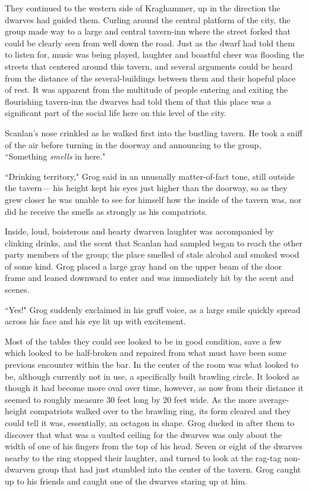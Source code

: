 They continued to the western side of Kraghammer, up in the direction the dwarves had guided them. Curling around the central platform of the city, the group made way to a large and central tavern-inn where the street forked that could be clearly seen from well down the road. Just as the dwarf had told them to listen for, music was being played, laughter and boastful cheer was flooding the streets that centered around this tavern, and several arguments could be heard from the distance of the several-buildings between them and their hopeful place of rest. It was apparent from the multitude of people entering and exiting the flourishing tavern-inn the dwarves had told them of that this place was a significant part of the social life here on this level of the city.

Scanlan's nose crinkled as he walked first into the bustling tavern. He took a sniff of the air before turning in the doorway and announcing to the group, ``Something \textit{smells} in here."

``Drinking territory," Grog said in an unusually matter-of-fact tone, still outside the tavern--- his height kept his eyes just higher than the doorway, so as they grew closer he was unable to see for himself how the inside of the tavern was, nor did he receive the smells as strongly as his compatriots. 

Inside, loud, boisterous and hearty dwarven laughter was accompanied by clinking drinks, and the scent that Scanlan had sampled began to reach the other party members of the group; the place smelled of stale alcohol and smoked wood of some kind. Grog placed a large gray hand on the upper beam of the door frame and leaned downward to enter and was immediately hit by the scent and scenes. 

``Yes!" Grog suddenly exclaimed in his gruff voice, as a large smile quickly spread across his face and his eye lit up with excitement.

Most of the tables they could see looked to be in good condition, save a few which looked to be half-broken and repaired from what must have been some previous encounter within the bar. In the center of the room was what looked to be, although currently not in use, a specifically built brawling circle. It looked as though it had become more oval over time, however, as now from their distance it seemed to roughly measure 30 feet long by 20 feet wide. As the more average-height compatriots walked over to the brawling ring, its form cleared and they could tell it was, essentially, an octagon in shape. Grog ducked in after them to discover that what was a vaulted ceiling for the dwarves was only about the width of one of his fingers from the top of his head. Seven or eight of the dwarves nearby to the ring stopped their laughter, and turned to look at the rag-tag non-dwarven group that had just stumbled into the center of the tavern. Grog caught up to his friends and caught one of the dwarves staring up at him.

